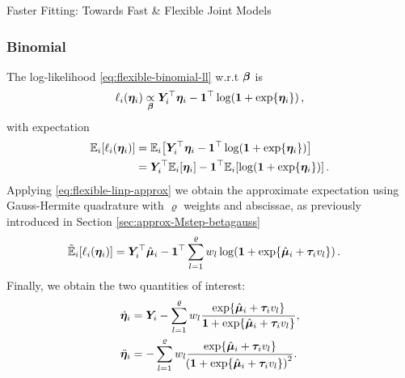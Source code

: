 \begin{chapter}{\label{cha:flexible}Faster Fitting: Towards Fast \& Flexible Joint Models}
\subsubsection{Binomial}
The log-likelihood \eqref{eq:flexible-binomial-ll} w.r.t $\bm{\beta}$ is 
\begin{align*}
    \ell_i\!\left(\bm{\eta}_i\right)\underset{\bm{\beta}}{\propto}\bm{Y}_i^\top\bm{\eta}_i-\bm{1}^\top\log\!\left(\bm{1}+\exp\!\left\{\bm{\eta}_i\right\}\right),
\end{align*}
with expectation
\begin{align*}
    \Expi{\elli{\linp}}&=\Expi{\Y^\top\linp-\boneT\log\lb\bone+\exp\lbr\linp\rbr\rb}\\
    &=\Y^\top\Expi{\linp}-\boneT\Expi{\log\lb\bone+\exp\lbr\linp\rbr\rb}.
\end{align*}
Applying \eqref{eq:flexible-linp-approx} we obtain the approximate expectation using Gauss-Hermite quadrature with $\varrho$ weights and abscissae, as previously introduced in Section \ref{sec:approx-Mstep-betagauss}
\begin{align*}
    \tilde{\mathbb{E}}_i\!\left[\ell_i\!\left(\bm{\eta}_i\right)\right]&=\bm{Y}_i^\top\hat{\bm{\mu}}_i-\bm{1}^\top\sum_{l=1}^\varrho w_l\log\!\left(\bm{1}+\exp\!\left\{\hat{\bm{\mu}}_i + \bm{\tau}_i v_l\right\}\right).
\end{align*}
Finally, we obtain the two quantities of interest:
\begin{equation}
    \begin{aligned}
        \dot{\bm{\eta}}_i &= \bm{Y}_i-\sum_{l=1}^\varrho w_l\frac{\exp\!\left\{\hat{\bm{\mu}}_i + \bm{\tau}_i v_l\right\}}{\bm{1} + \exp\!\left\{\hat{\bm{\mu}}_i + \bm{\tau}_i v_l\right\}},\\
        \ddot{\bm{\eta}}_i &= -\sum_{l=1}^\varrho w_l\frac{\exp\!\left\{\hat{\bm{\mu}}_i + \bm{\tau}_i v_l\right\}}{\!\left(\bm{1} + \exp\!\left\{\hat{\bm{\mu}}_i + \bm{\tau}_i v_l\right\}\right)^2}.
    \end{aligned}
\label{eq:flexible-Mstep-beta-binomial}    
\end{equation}


\end{chapter}
